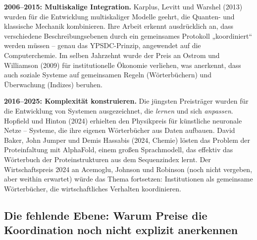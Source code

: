 \documentclass[12pt,a4paper]{article}
\begin{document}
	\textbf{2006–2015: Multiskalige Integration.} Karplus, Levitt und Warshel (2013) wurden für die Entwicklung multiskaliger Modelle geehrt, die Quanten- und klassische Mechanik kombinieren. Ihre Arbeit erkennt ausdrücklich an, dass verschiedene Beschreibungsebenen durch ein gemeinsames Protokoll „koordiniert“ werden müssen – genau das YPSDC-Prinzip, angewendet auf die Computerchemie. Im selben Jahrzehnt wurde der Preis an Ostrom und Williamson (2009) für institutionelle Ökonomie verliehen, was anerkennt, dass auch soziale Systeme auf gemeinsamen Regeln (Wörterbüchern) und Überwachung (Indizes) beruhen.
	
	\textbf{2016–2025: Komplexität konstruieren.} Die jüngsten Preisträger wurden für die Entwicklung von Systemen ausgezeichnet, die \emph{lernen} und sich \emph{anpassen}. Hopfield und Hinton (2024) erhielten den Physikpreis für künstliche neuronale Netze – Systeme, die ihre eigenen Wörterbücher aus Daten aufbauen. David Baker, John Jumper und Demis Hassabis (2024, Chemie) lösten das Problem der Proteinfaltung mit AlphaFold, einem großen Sprachmodell, das effektiv das Wörterbuch der Proteinstrukturen aus dem Sequenzindex lernt. Der Wirtschaftspreis 2024 an Acemoglu, Johnson und Robinson (noch nicht vergeben, aber weithin erwartet) würde das Thema fortsetzen: Institutionen als gemeinsame Wörterbücher, die wirtschaftliches Verhalten koordinieren.
	
	\subsection{Die fehlende Ebene: Warum Preise die Koordination noch nicht explizit anerkennen}
	
\end{document}
